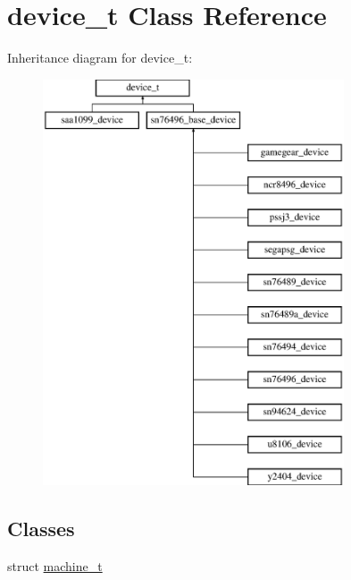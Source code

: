 \hypertarget{classdevice__t}{\section{device\-\_\-t Class Reference}
\label{classdevice__t}
}
Inheritance diagram for device\-\_\-t\-:\begin{figure}[H]
\begin{center}
\leavevmode
\includegraphics[height=12.000000cm]{classdevice__t}
\end{center}
\end{figure}
\subsection*{Classes}
\begin{DoxyCompactItemize}
\item 
struct \hyperlink{structdevice__t_1_1machine__t}{machine\-\_\-t}
\end{DoxyCompactItemize}
